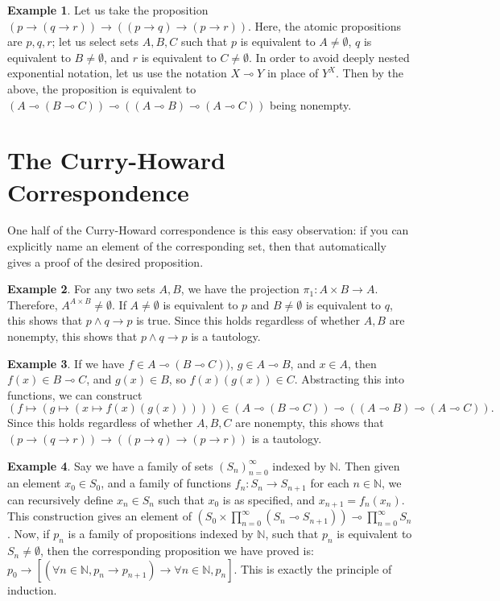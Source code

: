 \documentclass{article}
\theoremstyle{definition}
\newtheorem{example}{Example}
\begin{document}
	\begin{example}
		Let us take the proposition $(p \rightarrow (q \rightarrow r)) \rightarrow ((p \rightarrow q) \rightarrow (p \rightarrow r))$.  Here, the atomic propositions are $p, q, r$; let us select sets $A, B, C$ such that $p$ is equivalent to $A \ne \emptyset$, $q$ is equivalent to $B \ne \emptyset$, and $r$ is equivalent to $C \ne \emptyset$.  In order to avoid deeply nested exponential notation, let us use the notation $X \multimap Y$ in place of $Y^X$.  Then by the above, the proposition is equivalent to $(A \multimap (B \multimap C)) \multimap ((A \multimap B) \multimap (A \multimap C))$ being nonempty.
	\end{example}
	
	\section{The Curry-Howard Correspondence}
	One half of the Curry-Howard correspondence is this easy observation: if you can explicitly name an element of the corresponding set, then that automatically gives a proof of the desired proposition.
	
	\begin{example}
		For any two sets $A, B$, we have the projection $\pi_1 : A \times B \to A$.  Therefore, $A^{A \times B} \ne \emptyset$.  If $A\ne\emptyset$ is equivalent to $p$ and $B\ne\emptyset$ is equivalent to $q$, this shows that $p\land q \rightarrow p$ is true.  Since this holds regardless of whether $A, B$ are nonempty, this shows that $p\land q \rightarrow p$ is a tautology.
	\end{example}
	
	\begin{example}
		If we have $f \in A \multimap (B \multimap C))$, $g \in A \multimap B$, and $x \in A$, then $f(x) \in B\multimap C$, and $g(x) \in B$, so $f(x)(g(x)) \in C$.  Abstracting this into functions, we can construct
	$$(f \mapsto (g \mapsto (x \mapsto f(x)(g(x))))) \in 
	(A \multimap (B \multimap C)) \multimap ((A \multimap B) \multimap (A \multimap C)).$$
	Since this holds regardless of whether $A, B, C$ are nonempty, this shows that $(p \rightarrow (q \rightarrow r)) \rightarrow ((p \rightarrow q) \rightarrow (p \rightarrow r))$ is a tautology.
	\end{example}
	
	\begin{example}
		Say we have a family of sets $(S_n)_{n=0}^\infty$ indexed by $\mathbb{N}$.  Then given an element $x_0 \in S_0$, and a family of functions $f_n : S_n \to S_{n+1}$ for each $n\in \mathbb{N}$, we can recursively define $x_n \in S_n$ such that $x_0$ is as specified, and $x_{n+1} = f_n(x_n)$.  This construction gives an element of $(S_0 \times \prod_{n=0}^\infty (S_n \multimap S_{n+1})) \multimap \prod_{n=0}^\infty S_n$.  Now, if $p_n$ is a family of propositions indexed by $\mathbb{N}$, such that $p_n$ is equivalent to $S_n \ne \emptyset$, then the corresponding proposition we have proved is: $p_0 \rightarrow [(\forall n \in \mathbb{N}, p_n \rightarrow p_{n+1}) \rightarrow \forall n \in \mathbb{N}, p_n]$.  This is exactly the principle of induction.
	\end{example}
	
\end{document}
